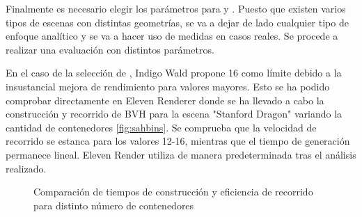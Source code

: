 Finalmente es necesario elegir los parámetros para  y . Puesto que existen varios tipos de escenas con distintas geometrías, se va a dejar de lado cualquier tipo de enfoque analítico y se va a hacer uso de medidas en casos reales. Se procede a realizar una evaluación con distintos parámetros.
	
En el caso de la selección de , Indigo Wald propone 16 como límite \cite{wald2007fast} debido a la insustancial mejora de rendimiento para valores mayores. Esto se ha podido comprobar directamente en Eleven Renderer donde se ha llevado a cabo la construcción y recorrido de BVH para la escena "Stanford Dragon" variando la cantidad de contenedores \autoref{fig:sahbins}. Se comprueba que la velocidad de recorrido se estanca para los valores 12-16, mientras que el tiempo de generación permanece lineal. Eleven Render utiliza de manera predeterminada  tras el análisis realizado.

\begin{figure}[H]
\centering
{}
\caption{Comparación de tiempos de construcción y eficiencia de recorrido para distinto número de contenedores}
\label{fig:sahbins}
\end{figure}